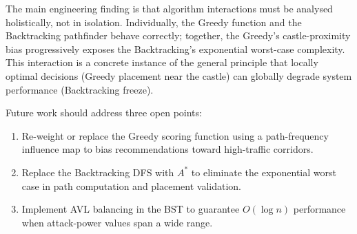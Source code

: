 \documentclass[12pt,a4paper]{report}
\begin{document}
The main engineering finding is that algorithm interactions must be analysed
holistically, not in isolation.
Individually, the Greedy function and the Backtracking pathfinder behave
correctly; together, the Greedy's castle-proximity bias progressively exposes
the Backtracking's exponential worst-case complexity.
This interaction is a concrete instance of the general principle that locally
optimal decisions (Greedy placement near the castle) can globally degrade
system performance (Backtracking freeze).

Future work should address three open points:
\begin{enumerate}
  \item Re-weight or replace the Greedy scoring function using a path-frequency
        influence map to bias recommendations toward high-traffic corridors.
  \item Replace the Backtracking DFS with $A^*$ to eliminate the exponential
        worst case in path computation and placement validation.
  \item Implement AVL balancing in the BST to guarantee $O(\log n)$
        performance when attack-power values span a wide range.
\end{enumerate}

\printbibliography[heading=bibintoc, title={References}]

\end{document}
